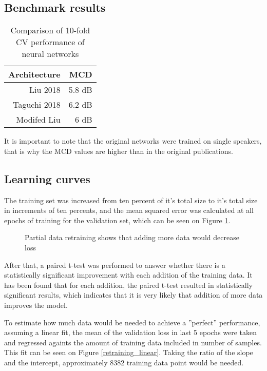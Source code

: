 \documentclass[a4paper]{article}
\begin{document}
\subsection{Benchmark results}
\begin{table}[th]
  \caption{Comparison of 10-fold CV performance of neural networks}
  \label{tab:example}
  \centering
  \begin{tabular}{ r r }
    \toprule
    \textbf{Architecture} & \textbf{MCD} \\
    \midrule
    Liu 2018 & 5.8 dB \\
    Taguchi 2018 & 6.2 dB               \\
    Modifed Liu & 6 dB               \\
    \bottomrule
  \end{tabular}
  
\end{table}

It is important to note that the original networks were trained on
single speakers, that is why the MCD values are higher than in the
original publications.


\subsection{Learning curves}

The training set was increased from ten percent of it's total size to it's
total size in increments of ten percents, and the mean squared error
was calculated at all epochs of training for the validation set, which
can be seen on Figure \ref{learning_curve}.

\begin{figure}[t]
  \begin{center}
    \scalebox{0.50}{}
    \caption{Partial data retraining shows that adding more data would
      decrease loss}
      \label{learning_curve}
\end{center}
\end{figure}


After that, a paired t-test was performed to answer whether there is
a statistically significant improvement with each addition of the training data.
It has been found that for each addition, the paired t-test resulted in statistically
significant results, which indicates that it is very likely that addition
of more data improves the model.

To estimate how much data would be needed to achieve a ''perfect'' performance,
assuming a linear fit, the mean of the validation loss in last 5 epochs
were taken and regressed againts the amount of training data included in
number of samples. This fit can be seen on Figure \ref{retraining_linear}.
Taking the ratio of the slope and the intercept, approximately 8382
training data point would be needed.
\end{document}

